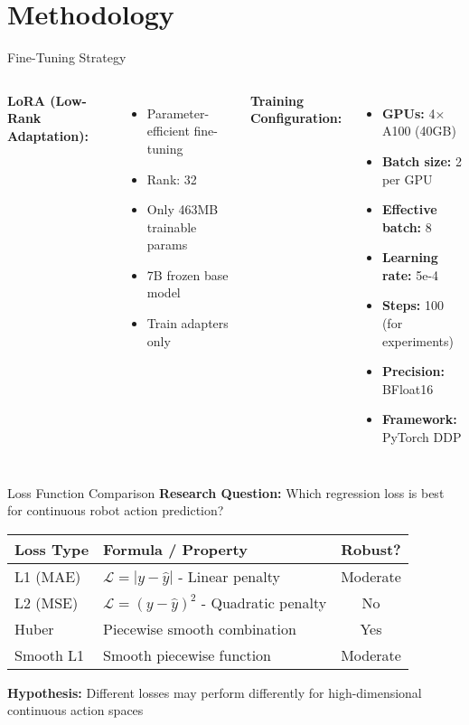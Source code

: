 \documentclass[aspectratio=169]{beamer}
\begin{document}
\section{Methodology}

\begin{frame}{Fine-Tuning Strategy}
\begin{columns}
\textbf{LoRA (Low-Rank Adaptation):}
\begin{itemize}
    \item Parameter-efficient fine-tuning
    \item Rank: 32
    \item Only 463MB trainable params
    \item 7B frozen base model
    \item Train adapters only
\end{itemize}

\vspace{0.3cm}


\textbf{Training Configuration:}
\begin{itemize}
    \item \textbf{GPUs:} 4× A100 (40GB)
    \item \textbf{Batch size:} 2 per GPU
    \item \textbf{Effective batch:} 8
    \item \textbf{Learning rate:} 5e-4
    \item \textbf{Steps:} 100 (for experiments)
    \item \textbf{Precision:} BFloat16
    \item \textbf{Framework:} PyTorch DDP
\end{itemize}
\end{columns}
\end{frame}

\begin{frame}{Loss Function Comparison}
\textbf{Research Question:} Which regression loss is best for continuous robot action prediction?

\vspace{0.5cm}
\begin{table}
\centering
\begin{tabular}{lp{6cm}c}
\toprule
\textbf{Loss Type} & \textbf{Formula / Property} & \textbf{Robust?} \\
\midrule
L1 (MAE) & $\mathcal{L} = |y - \hat{y}|$ - Linear penalty & Moderate \\
L2 (MSE) & $\mathcal{L} = (y - \hat{y})^2$ - Quadratic penalty & No \\
Huber & Piecewise smooth combination & Yes \\
Smooth L1 & Smooth piecewise function & Moderate \\
\bottomrule
\end{tabular}
\end{table}

\vspace{0.5cm}
\textbf{Hypothesis:} Different losses may perform differently for high-dimensional continuous action spaces
\end{frame}
\end{document}
